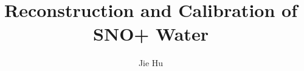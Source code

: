 \message{ !name(JieHuThesis.tex)}\documentclass[phd,black]{PrincetonThesis}
\title{Reconstruction and Calibration of SNO+ Water}
\author{Jie Hu}
\begin{document}


\begin{frontmatter}
  
  \begin{thesisabstract}
    
  \end{thesisabstract}
  
  \begin{acknowledgements}
    
  \end{acknowledgements}
  
\end{frontmatter}

\cleardoublepage
{}

	
\end{document}
